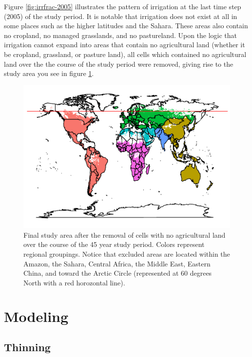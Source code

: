 \documentclass[12pt,twoside]{reedthesis}
\begin{document}
Figure \ref{fig:irrfrac-2005} illustrates the pattern of irrigation at the last time step (2005) of the study period. It is notable that irrigation does not exist at all in some places such as the higher latitudes and the Sahara. These areas also contain no cropland, no managed grasslands, and no pastureland. Upon the logic that irrigation cannot expand into areas that contain no agricultural land (whether it be cropland, grassland, or pasture land), all cells which contained no agricultural land over the the course of the study period were removed, giving rise to the study area you see in figure \ref{fig:study-region-nocrop}.
\begin{figure}
\centering
\includegraphics{thesis_files/figure-latex/study-region-nocrop-1.pdf}
\caption{\label{fig:study-region-nocrop}Final study area after the removal of cells with no agricultural land over the course of the 45 year study period. Colors represent regional groupings. Notice that excluded areas are located within the Amazon, the Sahara, Central Africa, the Middle East, Eastern China, and toward the Arctic Circle (represented at 60 degrees North with a red horozontal line).}
\end{figure}
\hypertarget{bayesintro}{%
\section{Modeling}\label{bayesintro}}

\hypertarget{thin}{%
\subsection{Thinning}\label{thin}}
\end{document}

